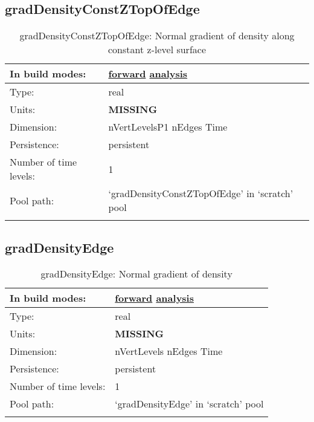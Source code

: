 \subsection[gradDensityConstZTopOfEdge]{gradDensityConstZTopOfEdge}
\label{subsec:var_sec_scratch_gradDensityConstZTopOfEdge}
\begin{center}
\begin{longtable}{| p{2.0in} | p{4.0in} |}
        \hline 
        In build modes: & \hyperref[subsec:forward_var_tab_scratch]{forward} \hyperref[subsec:analysis_var_tab_scratch]{analysis} \\
        \hline 
        Type: & real \\
        \hline 
        Units: & {\bf \color{red} MISSING} \\
        \hline 
        Dimension: & nVertLevelsP1 nEdges Time \\
        \hline 
        Persistence: & persistent \\
        \hline 
        Number of time levels: & 1 \\
        \hline 
            Pool path: & `gradDensityConstZTopOfEdge' in `scratch' pool \\
		 \hline 
    \caption{gradDensityConstZTopOfEdge: Normal gradient of density along constant z-level surface}
\end{longtable}
\end{center}
\subsection[gradDensityEdge]{gradDensityEdge}
\label{subsec:var_sec_scratch_gradDensityEdge}
\begin{center}
\begin{longtable}{| p{2.0in} | p{4.0in} |}
        \hline 
        In build modes: & \hyperref[subsec:forward_var_tab_scratch]{forward} \hyperref[subsec:analysis_var_tab_scratch]{analysis} \\
        \hline 
        Type: & real \\
        \hline 
        Units: & {\bf \color{red} MISSING} \\
        \hline 
        Dimension: & nVertLevels nEdges Time \\
        \hline 
        Persistence: & persistent \\
        \hline 
        Number of time levels: & 1 \\
        \hline 
            Pool path: & `gradDensityEdge' in `scratch' pool \\
		 \hline 
    \caption{gradDensityEdge: Normal gradient of density}
\end{longtable}
\end{center}
